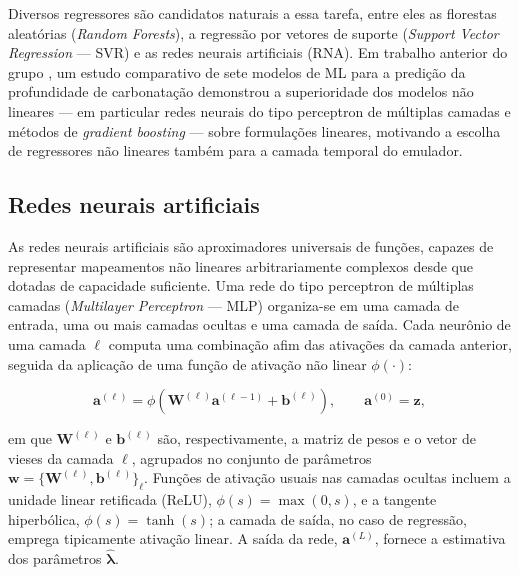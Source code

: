 Diversos regressores são candidatos naturais a essa tarefa, entre eles as florestas aleatórias (\textit{Random Forests}), a regressão por vetores de suporte (\textit{Support Vector Regression} --- SVR) e as redes neurais artificiais (RNA). Em trabalho anterior do grupo \parencite{couto2025}, um estudo comparativo de sete modelos de ML para a predição da profundidade de carbonatação demonstrou a superioridade dos modelos não lineares --- em particular redes neurais do tipo perceptron de múltiplas camadas e métodos de \textit{gradient boosting} --- sobre formulações lineares, motivando a escolha de regressores não lineares também para a camada temporal do emulador. 

\subsection{Redes neurais artificiais}
\label{subsec:redes_neurais}

As redes neurais artificiais são aproximadores universais de funções, capazes de representar mapeamentos não lineares arbitrariamente complexos desde que dotadas de capacidade suficiente. Uma rede do tipo perceptron de múltiplas camadas (\textit{Multilayer Perceptron} --- MLP) organiza-se em uma camada de entrada, uma ou mais camadas ocultas e uma camada de saída. Cada neurônio de uma camada $\ell$ computa uma combinação afim das ativações da camada anterior, seguida da aplicação de uma função de ativação não linear $\phi(\cdot)$:

\begin{equation}
\mathbf{a}^{(\ell)} = \phi\!\left(\mathbf{W}^{(\ell)} \mathbf{a}^{(\ell-1)} + \mathbf{b}^{(\ell)}\right), \qquad \mathbf{a}^{(0)} = \mathbf{z},
\label{eq:mlp_forward}
\end{equation}

\noindent em que $\mathbf{W}^{(\ell)}$ e $\mathbf{b}^{(\ell)}$ são, respectivamente, a matriz de pesos e o vetor de vieses da camada $\ell$, agrupados no conjunto de parâmetros $\mathbf{w} = \{\mathbf{W}^{(\ell)}, \mathbf{b}^{(\ell)}\}_\ell$. Funções de ativação usuais nas camadas ocultas incluem a unidade linear retificada (ReLU), $\phi(s) = \max(0,s)$, e a tangente hiperbólica, $\phi(s) = \tanh(s)$; a camada de saída, no caso de regressão, emprega tipicamente ativação linear. A saída da rede, $\mathbf{a}^{(L)}$, fornece a estimativa dos parâmetros $\hat{\boldsymbol{\lambda}}$.

